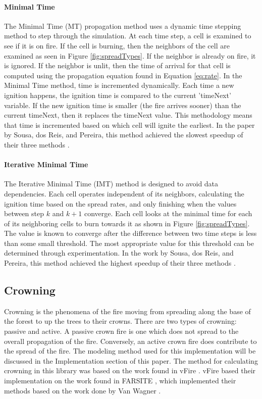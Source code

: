 \paragraph{Minimal Time}
The Minimal Time (MT) propagation method uses a dynamic time stepping method to step through the simulation. At each time step, a cell is examined to see if it is on fire. If the cell is burning, then the neighbors of the cell are examined as seen in Figure \ref{fig:spreadTypes}. If the neighbor is already on fire, it is ignored. If the neighbor is unlit, then the time of arrival for that cell is computed using the propagation equation found in Equation \ref{eq:rate}. In the Minimal Time method, time is incremented dynamically. Each time a new ignition happens, the ignition time is compared to the current 'timeNext' variable. If the new ignition time is smaller (the fire arrives sooner) than the current timeNext, then it replaces the timeNext value. This methodology means that time is incremented based on which cell will ignite the earliest. In the paper by Sousa, dos Reis, and Pereira, this method achieved the slowest speedup of their three methods \cite{gpufire}.

\paragraph{Iterative Minimal Time}
The Iterative Minimal Time (IMT) method is designed to avoid data dependencies. Each cell operates independent of its neighbors, calculating the ignition time based on the spread rates, and only finishing when the values between step $k$ and $k + 1$ converge. Each cell looks at the minimal time for each of its neighboring cells to burn towards it as shown in Figure \ref{fig:spreadTypes}. The value is known to converge after the difference between two time steps is less than some small threshold. The most appropriate value for this threshold can be determined through experimentation. In the work by Sousa, dos Reis, and Pereira, this method achieved the highest speedup of their three methods \cite{gpufire}. 

\subsection{Crowning}
Crowning is the phenomena of the fire moving from spreading along the base of the forest to up the trees to their crowns. There are two types of crowning: passive and active. A passive crown fire is one which does not spread to the overall propagation of the fire. Conversely, an active crown fire does contribute to the spread of the fire. The modeling method used for this implementation will be discussed in the Implementation section of this paper. The method for calculating crowning in this library was based on the work found in vFire \cite{vFire}. vFire based their implementation on the work found in FARSITE \cite{FARSITE}, which implemented their methods based on the work done by Van Wagner \cite{wagner1977,wagner1993}.


